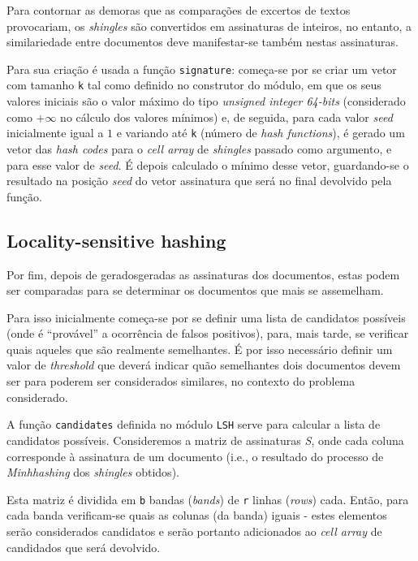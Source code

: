 \documentclass[a4paper,11pt,openright,oneside]{report}
\begin{document}
Para contornar as demoras que as comparações de excertos de textos provocariam, os \textit{shingles} são convertidos em assinaturas de inteiros, no entanto, a similariedade entre documentos deve manifestar-se também nestas assinaturas.

Para sua criação é usada a função \texttt{signature}: começa-se por se criar um vetor com tamanho \texttt{k} tal como definido no construtor do módulo, em que os seus valores iniciais são o valor máximo do tipo \textit{unsigned integer 64-bits} (considerado como $+\infty$ no cálculo dos valores mínimos) e, de seguida, para cada valor \textit{seed} inicialmente igual a $1$ e variando até \texttt{k} (número de \textit{hash functions}), é gerado um vetor das \textit{hash codes} para o \textit{cell array} de \textit{shingles} passado como argumento, e para esse valor de \textit{seed}. É depois calculado o mínimo desse vetor, guardando-se o resultado na posição \textit{seed} do vetor assinatura que será no final devolvido pela função.

\subsection{Locality-sensitive hashing}
\label{subsec.lsh}

Por fim, depois de geradosgeradas as assinaturas dos documentos, estas podem ser comparadas para se determinar os documentos que mais se assemelham.

Para isso inicialmente começa-se por se definir uma lista de candidatos possíveis (onde é ``provável'' a ocorrência de falsos positivos), para, mais tarde, se verificar quais aqueles que são realmente semelhantes. É por isso necessário definir um valor de \textit{threshold} que deverá indicar quão semelhantes dois documentos devem ser para poderem ser considerados similares, no contexto do problema considerado.

A função \texttt{candidates} definida no módulo \texttt{LSH} serve para calcular a lista de candidatos possíveis. Consideremos a matriz de assinaturas \textit{S}, onde cada coluna corresponde à assinatura de um documento (i.e., o resultado do processo de \textit{Minhhashing} dos \textit{shingles} obtidos).

Esta matriz é dividida em \texttt{b} bandas (\textit{bands}) de \texttt{r} linhas (\textit{rows}) cada. Então, para cada banda verificam-se quais as colunas (da banda) iguais - estes elementos serão considerados candidatos e serão portanto adicionados ao \textit{cell array} de candidados que será devolvido.
\end{document}
